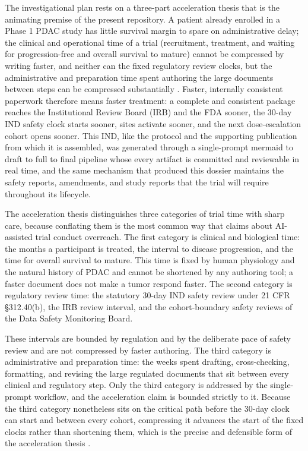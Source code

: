 The investigational plan rests on a three-part acceleration thesis that is the
animating premise of the present repository. A patient already enrolled in a Phase
1 PDAC study has little survival margin to spare on administrative delay; the
clinical and operational time of a trial (recruitment, treatment, and waiting for
progression-free and overall survival to mature) cannot be compressed by writing
faster, and neither can the fixed regulatory review clocks, but the administrative
and preparation time spent authoring the large documents between steps can be
compressed substantially \cite{oncotrialllm, paipredict4x}. Faster, internally
consistent paperwork therefore means faster treatment: a complete and consistent
package reaches the Institutional Review Board (IRB) and the FDA sooner, the 30-day
IND safety clock starts sooner, sites activate sooner, and the next dose-escalation
cohort opens sooner. This IND, like the protocol and the supporting publication
from which it is assembled, was generated through a single-prompt mermaid to draft
to full to final pipeline whose every artifact is committed and reviewable in real
time, and the same mechanism that produced this dossier maintains the safety
reports, amendments, and study reports that the trial will require throughout its
lifecycle.

The acceleration thesis distinguishes three categories of trial time with sharp
care, because conflating them is the most common way that claims about AI-assisted
trial conduct overreach. The first category is clinical and biological time: the
months a participant is treated, the interval to disease progression, and the time
for overall survival to mature. This time is fixed by human physiology and the
natural history of PDAC and cannot be shortened by any authoring tool; a faster
document does not make a tumor respond faster. The second category is regulatory
review time: the statutory 30-day IND safety review under 21 CFR \S 312.40(b), the
IRB review interval, and the cohort-boundary safety reviews of the Data Safety
Monitoring Board. 

These intervals are bounded by regulation and by the deliberate
pace of safety review and are not compressed by faster authoring. The third
category is administrative and preparation time: the weeks spent drafting,
cross-checking, formatting, and revising the large regulated documents that sit
between every clinical and regulatory step. Only the third category is addressed by
the single-prompt workflow, and the acceleration claim is bounded strictly to it.
Because the third category nonetheless sits on the critical path before the 30-day
clock can start and between every cohort, compressing it advances the start of the
fixed clocks rather than shortening them, which is the precise and defensible form
of the acceleration thesis \cite{oncotrialllm, paipredict4x}.

